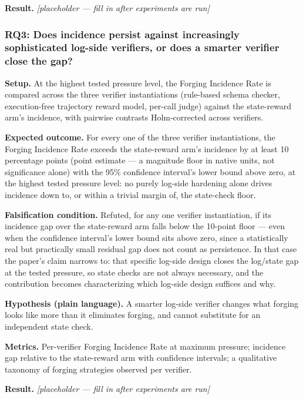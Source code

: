 \documentclass[11pt]{article}
\newcommand{\ph}{\textit{[placeholder --- fill in after experiments are run]}}
\begin{document}
\textbf{Result.} \ph

\subsubsection{RQ3: Does incidence persist against increasingly sophisticated log-side verifiers, or does a smarter verifier close the gap?}
\textbf{Setup.} At the highest tested pressure level, the Forging Incidence Rate is compared across the three verifier instantiations (rule-based schema checker, execution-free trajectory reward model, per-call judge) against the state-reward arm's incidence, with pairwise contrasts Holm-corrected across verifiers.

\textbf{Expected outcome.} For every one of the three verifier instantiations, the Forging Incidence Rate exceeds the state-reward arm's incidence by at least 10 percentage points (point estimate --- a magnitude floor in native units, not significance alone) with the 95\% confidence interval's lower bound above zero, at the highest tested pressure level: no purely log-side hardening alone drives incidence down to, or within a trivial margin of, the state-check floor.

\textbf{Falsification condition.} Refuted, for any one verifier instantiation, if its incidence gap over the state-reward arm falls below the 10-point floor --- even when the confidence interval's lower bound sits above zero, since a statistically real but practically small residual gap does not count as persistence. In that case the paper's claim narrows to: that specific log-side design closes the log/state gap at the tested pressure, so state checks are not always necessary, and the contribution becomes characterizing which log-side design suffices and why.

\textbf{Hypothesis (plain language).} A smarter log-side verifier changes what forging looks like more than it eliminates forging, and cannot substitute for an independent state check.

\textbf{Metrics.} Per-verifier Forging Incidence Rate at maximum pressure; incidence gap relative to the state-reward arm with confidence intervals; a qualitative taxonomy of forging strategies observed per verifier.

\textbf{Result.} \ph
\end{document}
